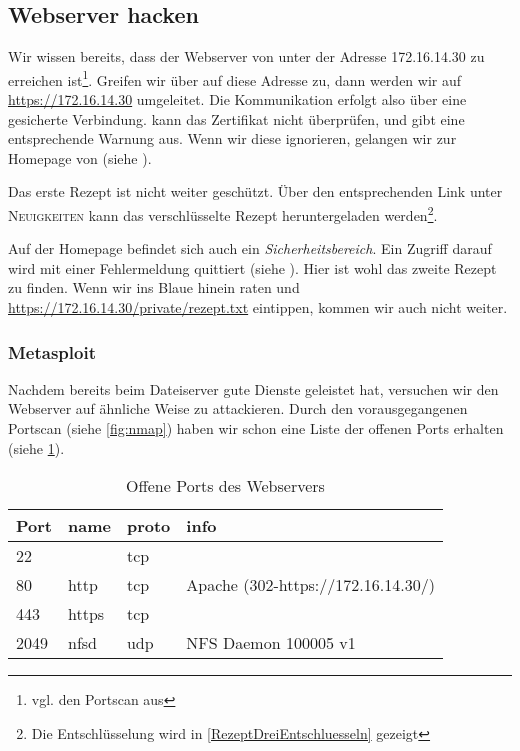 \subsection{Webserver hacken}

Wir wissen bereits, dass der Webserver von \Mayerbrot{} unter der Adresse
172.16.14.30 zu erreichen ist\footnote{vgl. den Portscan aus
  }. Greifen wir über \Firefox{} auf diese Adresse zu,
dann werden wir auf \url{https://172.16.14.30} umgeleitet. Die Kommunikation
erfolgt also über eine gesicherte Verbindung. \Firefox{} kann das Zertifikat
nicht überprüfen, und gibt eine entsprechende Warnung aus. Wenn wir diese
ignorieren, gelangen wir zur Homepage von \Mayerbrot{} (siehe
).


Das erste Rezept ist nicht weiter geschützt. Über den entsprechenden Link unter
\textsc{Neuigkeiten} kann das verschlüsselte Rezept heruntergeladen
werden\footnote{Die Entschlüsselung wird in \cref{RezeptDreiEntschluesseln}
  gezeigt}.

Auf der Homepage befindet sich auch ein \emph{Sicherheitsbereich}. Ein Zugriff
darauf wird mit einer Fehlermeldung quittiert (siehe
). Hier ist wohl das zweite Rezept zu finden. Wenn wir
ins Blaue hinein raten und \url{https://172.16.14.30/private/rezept.txt}
eintippen, kommen wir auch nicht weiter.


\subsubsection{Metasploit}

Nachdem \Metasploit{} bereits beim Dateiserver gute Dienste geleistet hat,
versuchen wir den Webserver auf ähnliche Weise zu attackieren. Durch den
vorausgegangenen Portscan (siehe \cref{fig:nmap}) haben wir schon eine Liste der
offenen Ports erhalten (siehe \cref{WebserverPortScan}).

\begin{table}[H]
\caption{Offene Ports des Webservers}
\label{WebserverPortScan}
\centering
\begin{tabular}{llll}
\toprule
Port & name & proto & info\\
\midrule
22 & & tcp & \\
80 & http & tcp & Apache (302-https://172.16.14.30/) \\
443 & https & tcp & \\
2049 & nfsd & udp & NFS Daemon 100005 v1\\
\bottomrule
\end{tabular}
\end{table}

